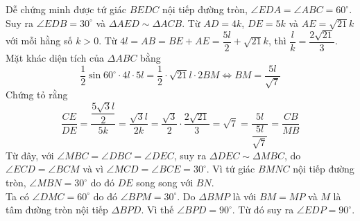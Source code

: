 \begin{ex}
{Dễ chứng minh được tứ giác $BEDC$ nội tiếp đường tròn,  $\angle EDA = \angle ABC = 60^{\circ}$. Suy ra $\angle EDB = 30^{\circ}$ và $\Delta AED\sim \Delta ACB$.  Từ $AD = 4k$, $DE = 5k$ và $AE = \sqrt{21}k$ với mỗi hằng số $k > 0$. Từ $4l = AB = BE + AE = \dfrac{5l}{2} + \sqrt{21}k$, thì $\dfrac{l}{k} = \dfrac{2\sqrt{21}}{3}$.\\
Mặt khác diện tích của $\Delta ABC$ bằng 
$$\dfrac{1}{2}\sin 60^{\circ}\cdot 4l\cdot 5l = \dfrac{1}{2}\cdot\sqrt{21}l \cdot 2BM\Leftrightarrow BM = \dfrac{5l}{\sqrt{7}}$$
Chứng tỏ rằng
$$\dfrac{CE}{DE} = \dfrac{\dfrac{5\sqrt{3}l}{2}}{5k} = \dfrac{\sqrt{3}l}{2k} = \dfrac{\sqrt{3}}{2}\cdot\dfrac{2\sqrt{21}}{3}= \sqrt{7} = \dfrac{5l}{\dfrac{5l}{\sqrt{7}}} = \dfrac{CB}{MB}$$ 
Từ đây, với $\angle MBC = \angle DBC = \angle DEC$, suy ra $\Delta DEC \sim \Delta MBC$, do  $\angle ECD = \angle BCM$ và vì  $\angle MCD = \angle BCE = 30^{\circ}$. Vì tứ giác $BMNC$ nội tiếp đường tròn,  $\angle MBN = 30^{\circ}$ do đó $DE$ song song với $BN$.\\
Ta có  $\angle DMC = 60^{\circ}$ do đó  $\angle BPM = 30^{\circ}$. Do $\Delta BMP$ là  với $BM = MP$ và $M$ là tâm đường tròn nội tiếp $\Delta BPD$. Vì thế  $\angle BPD = 90^{\circ}$. Từ đó suy ra  $\angle EDP = 90^{\circ}$.
 }
\end{ex}


